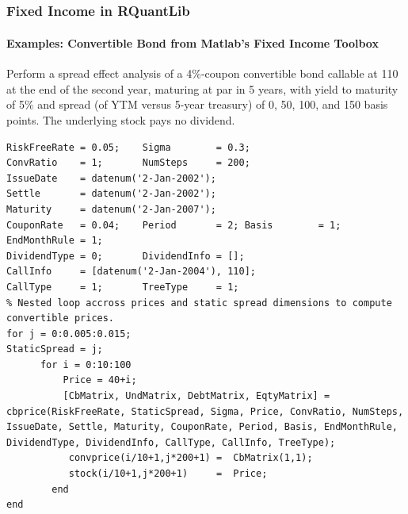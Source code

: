 \documentclass[compress]{beamer}
\begin{document}
\begin{frame}[fragile]
\hlstd{}\hlstd{\ \ \ \ \ \ \ \ \ \ \ \ \ \ \ \ \ }\hlsym{=}\hlstd{}\hlstd{}\hlsym{,}\hspace*{\fill}\\
\hlstd{}\hlstd{\ \ \ \ \ \ \ \ \ \ \ \ \ \ \ \ \ }\hlsym{=}\hlstd{}\hlstd{}\hlsym{)}\hspace*{\fill}\\
\hlsym{$<${-}\ }\hlstd{}\hlstd{}\hlsym{(}\hlstd{}\hlstd{}\hlsym{)}\hspace*{\fill}\\
\hlstd{}\hspace*{\fill}\\
\hlsym{(}\hlsym{,\ }\hlsym{,}\hspace*{\fill}\\
\hlstd{}\hlstd{\ \ \ \ \ \ \ \ \ \ \ \ \ \ }\hlsym{,\ }\hlsym{)}\hlstd{}\hspace*{\fill}\\
\mbox{}
\normalfont
\end{frame}

\begin{frame}[fragile]
	\frametitle{Fixed Income in RQuantLib}
	\framesubtitle{Examples: Convertible Bond from Matlab's Fixed Income Toolbox}	
	\scriptsize
Perform a spread effect analysis of a 4\%-coupon convertible bond callable at 110 at the end of the second year, maturing at par in 5 years, with yield to maturity of 5\% and spread (of YTM versus 5-year treasury) of 0, 50, 100, and 150 basis points. The underlying stock pays no dividend. 
\lstset{language=Matlab,basicstyle=\tiny}
	\begin{lstlisting}
RiskFreeRate = 0.05;	Sigma        = 0.3;
ConvRatio    = 1;   	NumSteps     = 200;
IssueDate    = datenum('2-Jan-2002');
Settle       = datenum('2-Jan-2002');
Maturity     = datenum('2-Jan-2007');
CouponRate   = 0.04;    Period       = 2; Basis        = 1;		EndMonthRule = 1;
DividendType = 0;		DividendInfo = [];
CallInfo     = [datenum('2-Jan-2004'), 110]; 
CallType     = 1;		TreeType     = 1;   
% Nested loop accross prices and static spread dimensions to compute convertible prices.
for j = 0:0.005:0.015;
StaticSpread = j;
      for i = 0:10:100
          Price = 40+i;
          [CbMatrix, UndMatrix, DebtMatrix, EqtyMatrix] =  cbprice(RiskFreeRate, StaticSpread, Sigma, Price, ConvRatio, NumSteps, IssueDate, Settle, Maturity, CouponRate, Period, Basis, EndMonthRule, DividendType, DividendInfo, CallType, CallInfo, TreeType);   
           convprice(i/10+1,j*200+1) =  CbMatrix(1,1);
           stock(i/10+1,j*200+1)     =  Price;
        end    
end
\end{lstlisting}
\end{frame}
\end{document}
